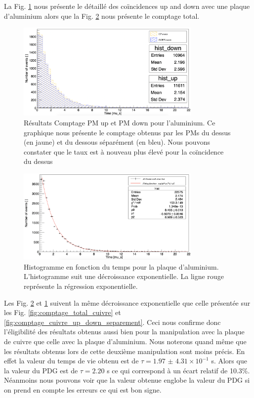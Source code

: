 \documentclass[12pt]{article}
\begin{document}
La Fig. \ref{fig:comptage_Aluminium_up_down_separement} nous présente le détaillé des coïncidences up and down avec une plaque d'aluminium alors que la Fig. \ref{fig:comptage_total_aluminium} nous présente le comptage total.


\begin{figure}
    \centering
    \includegraphics[width=0.8\textwidth]{graphiques/experience1/Aluminium/comptage_Aluminium_up_down_separement.png}
    \caption{Résultats Comptage PM up et PM down pour l'aluminium. Ce graphique nous présente le comptage obtenus par les PMs du dessus (en jaune) et du dessous séparément (en bleu). Nous pouvons constater que le taux est à nouveau plus élevé pour la coïncidence du dessus}
    \label{fig:comptage_Aluminium_up_down_separement}
\end{figure}

\begin{figure}
    \centering
    \includegraphics[width=0.8\textwidth]{graphiques/experience1/Aluminium/comptage_total_Aluminium.png}
    \caption{Histogramme en fonction du temps pour la plaque d'aluminium. L’histogramme suit une décroissance exponentielle. La ligne rouge représente la régression exponentielle.}
    \label{fig:comptage_total_aluminium}
\end{figure}

Les Fig. \ref{fig:comptage_total_aluminium} et \ref{fig:comptage_Aluminium_up_down_separement} suivent la même décroissance exponentielle que celle présentée sur les Fig. \ref{fig:comptage_total_cuivre} et \ref{fig:comptage_cuivre_up_down_separement}. Ceci nous confirme donc l'éligibilité des résultats obtenus aussi bien pour la manipulation avec la plaque de cuivre que celle avec la plaque d'aluminium. Nous noterons quand même que les résultats obtenus lors de cette deuxième manipulation sont moins précis. En effet la valeur du temps de vie obtenu est de $\tau=1.97$ $\pm$ $4.31\times10^{-1}$ \SIUnitSymbolMicro s. Alors que la valeur du PDG est de $\tau=2.20$ \SIUnitSymbolMicro s ce qui correspond à un écart relatif de 10.3\%. Néanmoins nous pouvons voir que la valeur obtenue englobe la valeur du PDG si on prend en compte les erreurs ce qui est bon signe. 
\end{document}
